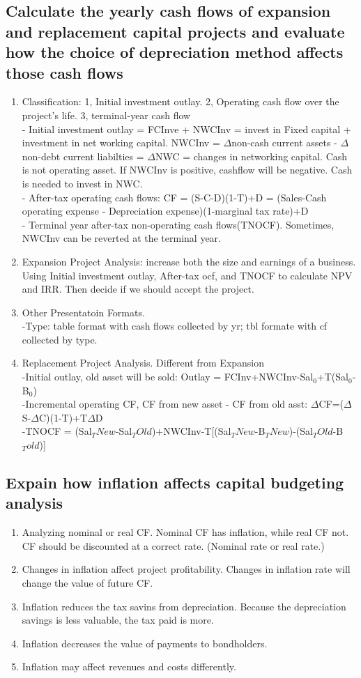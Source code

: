 \documentclass{article}
\newcommand{\be}{\begin{enumerate}}
\newcommand{\ee}{\end{enumerate}}
\begin{document}
\subsection{Calculate the yearly cash flows of expansion and replacement
capital projects and evaluate how the choice of depreciation method affects those
cash flows}
\be
    \item Classification: 1, Initial investment outlay. 2, Operating cash flow over
        the project's life. 3, terminal-year cash flow
        \\- Initial investment outlay = FCInve + NWCInv = invest in Fixed capital
        + investment in net working capital.  NWCInv = $\Delta$non-cash current assets - $\Delta$non-debt current liabilties
            = $\Delta$NWC = changes in networking capital. Cash is not operating asset. If NWCInv is positive, cashflow will be negative. Cash
        is needed to invest in NWC.
        \\-  After-tax operating cash flows: CF = (S-C-D)(1-T)+D 
        = (Sales-Cash operating expense - Depreciation expense)(1-marginal tax rate)+D
        \\- Terminal year after-tax non-operating cash flows(TNOCF). Sometimes, NWCInv can be
        reverted at the terminal year.
    \item Expansion Project Analysis: increase both the size and earnings of a business.
        Using Initial investment outlay, After-tax ocf, and TNOCF to calculate NPV and IRR. Then 
        decide if we should accept the project.
    \item Other Presentatoin Formats.
        \\-Type: table format with cash flows collected by yr; tbl formate with cf collected by type.
    \item Replacement Project Analysis. Different from Expansion
        \\-Initial outlay, old asset will be sold: Outlay = FCInv+NWCInv-Sal$_0$+T(Sal$_0$-B$_0$)
        \\-Incremental operating CF, CF from new asset - CF from old asst: 
        $\Delta$CF=($\Delta$S-$\Delta$C)(1-T)+T$\Delta$D
        \\-TNOCF = (Sal$_TNew$-Sal$_TOld$)+NWCInv-T[(Sal$_TNew$-B$_TNew$)-(Sal$_TOld$-B$_Told$)]
\ee
\subsection{Expain how inflation affects capital budgeting analysis}
\be
    \item Analyzing nominal or real CF. Nominal CF has inflation, while real CF not. CF should be
        discounted at a correct rate. (Nominal rate or real rate.)
    \item Changes in inflation affect project profitability. Changes in inflation rate
        will change the value of future CF.
    \item Inflation reduces the tax savins from depreciation. Because the depreciation
        savings is less valuable, the tax paid is more.
    \item Inflation decreases the value of payments to bondholders.
    \item Inflation may affect revenues and costs differently.
\ee
\end{document}
